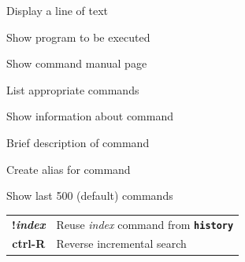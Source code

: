 \documentclass[12pt, a4paper]
{article}
\begin{document}
\begin{multicols}{3}
		\begin{description}[nolistsep]
			\item[echo] Display a line of text
			\item[which] Show program to be executed
			\item[man] Show command manual page
			\item[apropos] List appropriate commands
			\item[info] Show information about command
			\item[whatis] Brief description of command
			\item[alias] Create alias for command
			\item[history] Show last 500 (default) commands
			\item
			\begin{tabular}{cl}
				{\large \ttfamily \textbf{!\textit{index}}} & Reuse \textit{index} command from \texttt{\textbf{history}}\\
				{\large \ttfamily \textbf{ctrl-R}} & Reverse incremental search \\
			\end{tabular}
		\end{description}
		
		

\end{multicols}
\end{document}
